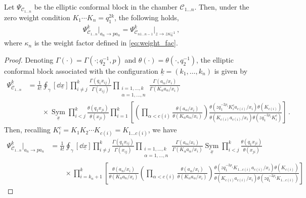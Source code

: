 \begin{lemma}\label{lemma:n_gen}
Let $\Psi_{\mathscr{C}_{1\ldots n}}$ be the elliptic conformal block in the chamber $\mathscr{C}_{1\ldots n}$.
Then, under the zero weight condition $K_1 \cdots K_n = q_1^{2k}$, the following holds,
\begin{align}
    \Psi_{\mathscr{C}_{1\ldots n}}^{\underline{k}}\Big|_{a_n \to p a_n} = \Psi_{\mathscr{C}_{n1\ldots n-1}}^{\underline{k}}\Big|_{z \to z \kappa_n^{-1}}
    \, ,
\end{align}
where $\kappa_n$ is the weight factor defined in \eqref{eq:weight_fac}.
\end{lemma}
\begin{proof}
Denoting $\Gamma(\cdot) = \Gamma(\cdot;q_2^{-1},p)$ and $\theta(\cdot) = \theta(\cdot,q_2^{-1})$, the elliptic conformal block associated with the configuration $\underline{k}=(k_1,\ldots,k_n)$ is given by
\begin{align}
    \Psi_{\mathscr{C}_{1\ldots n}}^{\underline{k}}
    & = \frac{1}{k!} \oint_\gamma [\dd{\underline{x}}] \prod_{i \neq j}^k \frac{\Gamma(q_1 x_{ij})}{\Gamma(x_{ij})} \prod_{\substack{i=1,\ldots,k \\ \alpha=1,\ldots,n}} \frac{\Gamma( a_\alpha/x_i)}{\Gamma(K_\alpha a_\alpha/x_i)} 
    \nonumber \\
    & \qquad \times
    \operatorname*{Sym}_{\underline{x}}
    \prod_{i<j}^k \frac{\theta(q_1 x_{ji})}{\theta(x_{ji})}
    \prod_{i=1}^k \left[ \left( \prod_{\alpha < c(i)} \frac{\theta(a_\alpha/x_i)}{\theta(K_\alpha a_\alpha / x_i)} \right) \frac{\theta(z q_1^{-2\rho_i} K_{i}^c a_{c(i)}/x_i) \theta(K_{c(i)})}{\theta(K_{c(i)} a_{c(i)} / x_i) \theta(z q_1^{-2\rho_i} K_i^c)} \right]
    \, .
\end{align}
Then, recalling $K_i^c = K_1 K_2 \cdots K_{c(i)} = K_{1\ldots c(i)}$, we have
\begin{align}
    \Psi_{\mathscr{C}_{1\ldots n}}^{\underline{k}}\Big|_{a_n \to p a_n} 
    & = \frac{1}{k!} \oint_\gamma [\dd{\underline{x}}] \prod_{i \neq j}^k \frac{\Gamma(q_1 x_{ij})}{\Gamma(x_{ij})} \prod_{\substack{i=1,\ldots,k \\ \alpha=1,\ldots,n}} \frac{\Gamma( a_\alpha/x_i)}{\Gamma(K_\alpha a_\alpha/x_i)} \operatorname*{Sym}_{\underline{x}} \prod_{i<j}^k \frac{\theta(q_1 x_{ji})}{\theta(x_{ji})}
    \nonumber \\
    & \qquad \times
    \prod_{i=k_n+1}^k \left[ \frac{\theta(a_n/x_i)}{\theta(K_n a_n/x_i)} \left( \prod_{\alpha < c(i)} \frac{\theta(a_\alpha/x_i)}{\theta(K_\alpha a_\alpha / x_i)} \right) \frac{\theta(z q_1^{-2\rho_i} K_{1\ldots c(i)} a_{c(i)}/x_i) \theta(K_{c(i)})}{\theta(K_{c(i)} a_{c(i)} / x_i) \theta(z q_1^{-2\rho_i} K_{1\ldots c(i)})} \right]

\end{align}
\end{proof}
